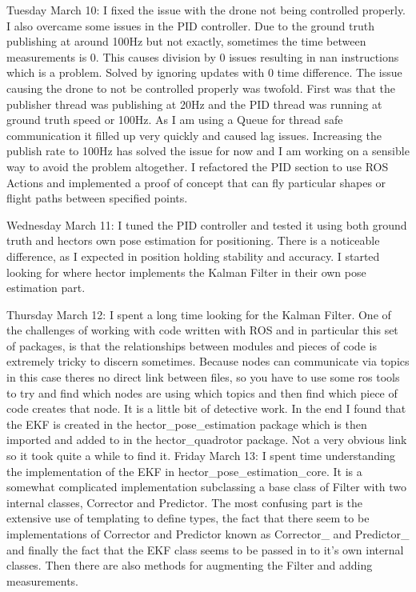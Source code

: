 \documentclass[]{../resources/final_report}
\begin{document}
\begin{appendices}
  Tuesday March 10: I fixed the issue with the drone not being controlled properly. I also overcame some issues in the PID controller. Due to the ground truth publishing at around 100Hz but not exactly, sometimes the time between measurements is 0. This causes division by 0 issues resulting in nan instructions which is a problem. Solved by ignoring updates with 0 time difference. The issue causing the drone to not be controlled properly was twofold. First was that the publisher thread was publishing at 20Hz and the PID thread was running at ground truth speed or 100Hz. As I am using a Queue for thread safe communication it filled up very quickly and caused lag issues. Increasing the publish rate to 100Hz has solved the issue for now and I am working on a sensible way to avoid the problem altogether. I refactored the PID section to use ROS Actions and implemented a proof of concept that can fly particular shapes or flight paths between specified points.

  Wednesday March 11: I tuned the PID controller and tested it using both ground truth and hectors own pose estimation for positioning. There is a noticeable difference, as I expected in position holding stability and accuracy. I started looking for where hector implements the Kalman Filter in their own pose estimation part.

  Thursday March 12: I spent a long time looking for the Kalman Filter. One of the challenges of working with code written with ROS and in particular this set of packages, is that the relationships between modules and pieces of code is extremely tricky to discern sometimes. Because nodes can communicate via topics in this case theres no direct link between files, so you have to use some ros tools to try and find which nodes are using which topics and then find which piece of code creates that node. It is a little bit of detective work. In the end I found that the EKF is created in the hector\_pose\_estimation package which is then imported and added to in the hector\_quadrotor package. Not a very obvious link so it took quite a while to find it.
  Friday March 13: I spent time understanding the implementation of the EKF in hector\_pose\_estimation\_core. It is a somewhat complicated implementation subclassing a base class of Filter with two internal classes, Corrector and Predictor. The most confusing part is the extensive use of templating to define types, the fact that there seem to be implementations of Corrector and Predictor known as Corrector\_ and Predictor\_ and finally the fact that the EKF class seems to be passed in to it’s own internal classes. Then there are also methods for augmenting the Filter and adding measurements.


\end{appendices}
\end{document}

